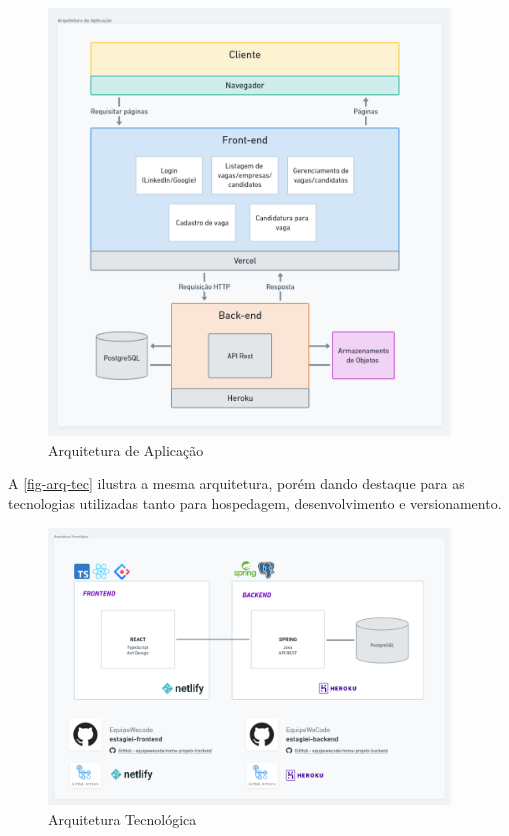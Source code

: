 \begin{figure}[H]
	\centering
	\caption{\label{fig-arq-app}Arquitetura de Aplicação}
	\includegraphics[width=0.95\textwidth]{../imagens/arq-proj-arq-app2.png}
\end{figure}

A \autoref{fig-arq-tec} ilustra a mesma arquitetura, porém dando destaque para as tecnologias utilizadas tanto para hospedagem, desenvolvimento e versionamento.

\begin{figure}[H]
	\centering
	\caption{\label{fig-arq-tec}Arquitetura Tecnológica}
	\includegraphics[width=0.95\textwidth]{../imagens/arq-proj-arq-tec3.png}
\end{figure}

